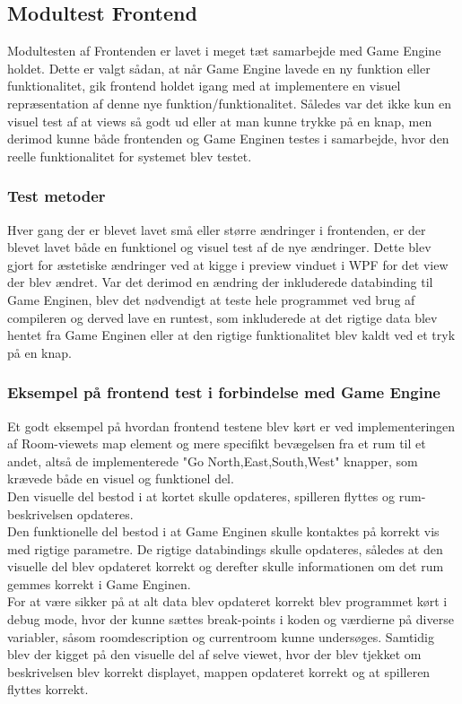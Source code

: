 \subsection{Modultest Frontend}
Modultesten af Frontenden er lavet i meget tæt samarbejde med Game Engine holdet. Dette er valgt sådan, at når Game Engine lavede en ny funktion eller funktionalitet, gik frontend holdet igang med at implementere en visuel repræsentation af denne nye funktion/funktionalitet. Således var det ikke kun en visuel test af at views så godt ud eller at man kunne trykke på en knap, men derimod kunne både frontenden og Game Enginen testes i samarbejde, hvor den reelle funktionalitet for systemet blev testet.

\subsubsection{Test metoder}
Hver gang der er blevet lavet små eller større ændringer i frontenden, er der blevet lavet både en funktionel og visuel test af de nye ændringer. Dette blev gjort for æstetiske ændringer ved at kigge i preview vinduet i WPF for det view der blev ændret. Var det derimod en ændring der inkluderede databinding til Game Enginen, blev det nødvendigt at teste hele programmet ved brug af compileren og derved lave en runtest, som inkluderede at det rigtige data blev hentet fra Game Enginen eller at den rigtige funktionalitet blev kaldt ved et tryk på en knap.

\subsubsection{Eksempel på frontend test i forbindelse med Game Engine}
Et godt eksempel på hvordan frontend testene blev kørt er ved implementeringen af Room-viewets map element og mere specifikt bevægelsen fra et rum til et andet, altså de implementerede "Go North,East,South,West" knapper, som krævede både en visuel og funktionel del.\\
Den visuelle del bestod i at kortet skulle opdateres, spilleren flyttes og rum-beskrivelsen opdateres.\\
Den funktionelle del bestod i at Game Enginen skulle kontaktes på korrekt vis med rigtige parametre. De rigtige databindings skulle opdateres, således at den visuelle del blev opdateret korrekt og derefter skulle informationen om det rum gemmes korrekt i Game Enginen.\\
For at være sikker på at alt data blev opdateret korrekt blev programmet kørt i debug mode, hvor der kunne sættes break-points i koden og værdierne på diverse variabler, såsom roomdescription og currentroom kunne undersøges. Samtidig blev der kigget på den visuelle del af selve viewet, hvor der blev tjekket om beskrivelsen blev korrekt displayet, mappen opdateret korrekt og at spilleren flyttes korrekt.
